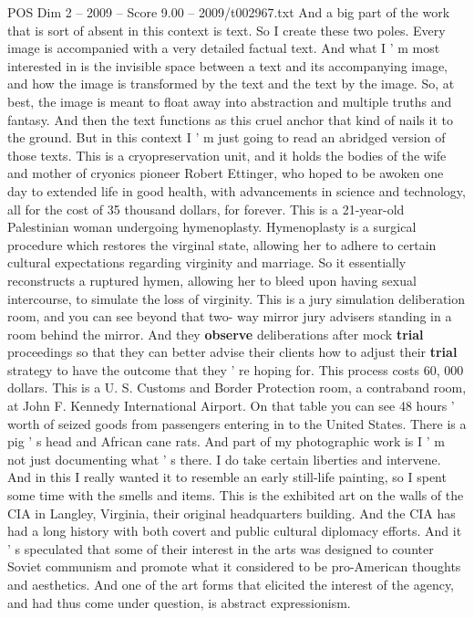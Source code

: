 \begin{textsample}{POS Dim 2 – 2009 – Score 9.00 – 2009/t002967.txt}
And a big part of the work that is sort of absent in this context is text.
So I create these two poles.
Every image is accompanied with a very detailed factual text.
And what I ' m most interested in is the invisible space between a text and its accompanying image, and how the image is transformed by the text and the text by the image.
So, at best, the image is meant to float away into abstraction and multiple truths and fantasy.
And then the text functions as this cruel anchor that kind of nails it to the ground.
But in this context I ' m just going to read an abridged version of those texts.
This is a cryopreservation unit, and it holds the bodies of the wife and mother of cryonics pioneer Robert Ettinger, who hoped to be awoken one day to extended life in good health, with advancements in science and technology, all for the cost of 35 thousand dollars, for forever.
This is a 21-year-old Palestinian woman undergoing hymenoplasty.
Hymenoplasty is a surgical procedure which restores the virginal state, allowing her to adhere to certain cultural expectations regarding virginity and marriage.
So it essentially reconstructs a ruptured hymen, allowing her to bleed upon having sexual intercourse, to simulate the loss of virginity.
This is a jury simulation deliberation room, and you can see beyond that two- way mirror jury advisers standing in a room behind the mirror.
And they \textbf{observe} deliberations after mock \textbf{trial} proceedings so that they can better advise their clients how to adjust their \textbf{trial} strategy to have the outcome that they ' re hoping for.
This process costs 60, 000 dollars.
This is a U.
S.
Customs and Border Protection room, a contraband room, at John F.
Kennedy International Airport.
On that table you can see 48 hours ' worth of seized goods from passengers entering in to the United States.
There is a pig ' s head and African cane rats.
And part of my photographic work is I ' m not just documenting what ' s there.
I do take certain liberties and intervene.
And in this I really wanted it to resemble an early still-life painting, so I spent some time with the smells and items.
This is the exhibited art on the walls of the CIA in Langley, Virginia, their original headquarters building.
And the CIA has had a long history with both covert and public cultural diplomacy efforts.
And it ' s speculated that some of their interest in the arts was designed to counter Soviet communism and promote what it considered to be pro-American thoughts and aesthetics.
And one of the art forms that elicited the interest of the agency, and had thus come under question, is abstract expressionism.

\end{textsample}
